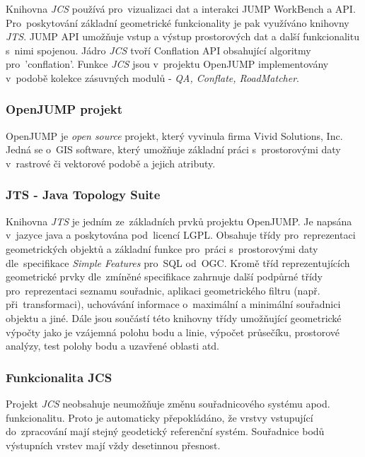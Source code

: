 Knihovna \textit{JCS} používá pro~vizualizaci dat a interakci JUMP WorkBench a API. Pro~poskytování základní geometrické funkcionality je pak využíváno knihovny \textit{JTS}. 
JUMP API umožňuje vstup a výstup prostorových dat a další funkcionalitu s~nimi spojenou. Jádro \textit{JCS} tvoří Conflation API obsahující algoritmy pro~'conflation'. 
Funkce \textit{JCS} jsou v~projektu OpenJUMP implementovány v~podobě kolekce zásuvných modulů - \textit{QA, Conflate, RoadMatcher}.

\subsubsection{OpenJUMP projekt}

OpenJUMP je \textit{open source} projekt, který vyvinula firma Vivid Solutions, Inc. Jedná se o~GIS software, který umožňuje základní práci 
s~prostorovými daty v~rastrové či vektorové podobě a jejich atributy.

\subsubsection{JTS - Java Topology Suite}

Knihovna \textit{JTS} je jedním ze~základních prvků projektu OpenJUMP. Je napsána v~jazyce java a poskytována pod~licencí LGPL. Obsahuje třídy pro~reprezentaci geometrických
objektů a základní funkce pro~práci s~prostorovými daty dle~specifikace \textit{Simple Features} pro~SQL od~OGC. Kromě tříd reprezentujících geometrické prvky dle~zmíněné
specifikace zahrnuje další podpůrné třídy pro~reprezentaci seznamu souřadnic, aplikaci geometrického filtru (např. při~transformaci), uchovávání informace o~maximální a 
minimální souřadnici objektu a jiné. Dále jsou součástí této knihovny třídy umožňující geometrické výpočty jako je vzájemná polohu bodu a linie, výpočet průsečíku, prostorové
analýzy, test polohy bodu a uzavřené oblasti atd. 

\subsubsection{Funkcionalita JCS} %

Projekt \textit{JCS} neobsahuje neumožňuje změnu souřadnicového systému apod. funkcionalitu. Proto je automaticky přepokládáno, že vrstvy vstupující do~zpracování mají stejný
geodetický referenční systém. Souřadnice bodů výstupních vrstev mají vždy desetinnou přesnost.  %

